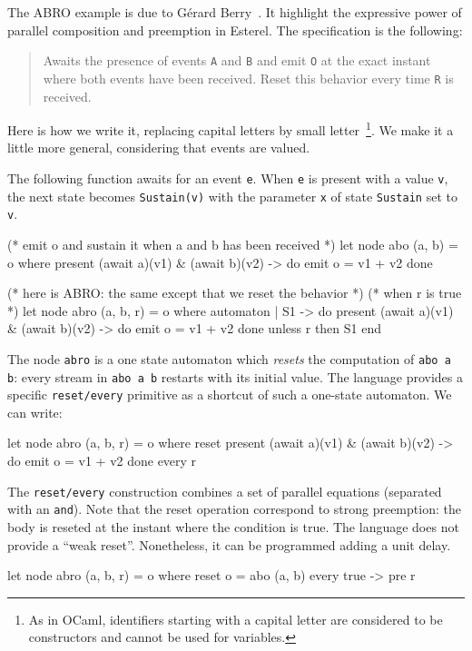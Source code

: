 \documentclass[11pt,titlepage,twoside]{report}
\newcommand{\ocaml}{{\sf OCaml}}
\begin{document}
The ABRO example is due to G\'erard Berry~\cite{esterel:primer99}. It
highlight the expressive power of parallel composition and preemption
in Esterel. The specification is the following:

\begin{quote}
Awaits the presence of events \verb-A- and \verb-B- and emit \verb-O-
at the exact instant where both events have been received.  Reset this
behavior every time \verb-R- is received.
\end{quote}
Here is how we write it, replacing capital letters by small
letter~\footnote{As in \ocaml, identifiers starting with a capital
  letter are considered to be constructors and cannot be used for
  variables.}. We make it a little more general, considering that
events are valued.

The following function awaits for an event \texttt{e}. When \texttt{e} is present with
a value \texttt{v}, the next state becomes \texttt{Sustain(v)} with the parameter
\texttt{x} of state \texttt{Sustain} set to \texttt{v}.
\begin{chklisting}[withresult,include=await,label=abo]
(* emit o and sustain it when a and b has been received *)
let node abo (a, b) = o where
  present (await a)(v1) & (await b)(v2) -> do emit o = v1 + v2 done
\end{chklisting}
%
\begin{chklisting}
(* here is ABRO: the same except that we reset the behavior *)
(* when r is true *)
let node abro (a, b, r) = o where
  automaton
  | S1 ->
       do present (await a)(v1) & (await b)(v2) -> do emit o = v1 + v2 done
       unless r then S1
  end
\end{chklisting}

The node \verb-abro- is a one state automaton which {\em resets} the
computation of \verb-abo a b-: every stream in \verb-abo a b- restarts
with its initial value. The language provides a specific
\verb-reset/every- primitive as a shortcut of such a one-state
automaton. We can write:
\begin{chklisting}[withresult,include=await]
let node abro (a, b, r) = o where
  reset
    present (await a)(v1) & (await b)(v2) -> do emit o = v1 + v2 done
  every r
\end{chklisting}

The \verb-reset/every- construction combines a set of parallel
equations (separated with an \verb-and-). Note that the reset
operation correspond to strong preemption: the body is reseted at the
instant where the condition is true. The language does not provide a
``weak reset''. Nonetheless, it can be programmed adding a unit delay.
\begin{chklisting}[withresult,include=abo]
  let node abro (a, b, r) = o where
    reset
      o = abo (a, b)
    every true -> pre r
\end{chklisting}
\end{document}
